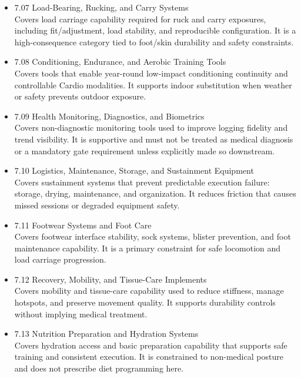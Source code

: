 \documentclass[10pt]{article}
\begin{document}
\begin{itemize}
\item 7.07 Load-Bearing, Rucking, and Carry Systems\\
Covers load carriage capability required for ruck and carry exposures, including fit/adjustment, load stability, and reproducible configuration. It is a high-consequence category tied to foot/skin durability and safety constraints.

\item 7.08 Conditioning, Endurance, and Aerobic Training Tools\\
Covers tools that enable year-round low-impact conditioning continuity and controllable Cardio modalities. It supports indoor substitution when weather or safety prevents outdoor exposure.

\item 7.09 Health Monitoring, Diagnostics, and Biometrics\\
Covers non-diagnostic monitoring tools used to improve logging fidelity and trend visibility. It is supportive and must not be treated as medical diagnosis or a mandatory gate requirement unless explicitly made so downstream.

\item 7.10 Logistics, Maintenance, Storage, and Sustainment Equipment\\
Covers sustainment systems that prevent predictable execution failure: storage, drying, maintenance, and organization. It reduces friction that causes missed sessions or degraded equipment safety.

\item 7.11 Footwear Systems and Foot Care\\
Covers footwear interface stability, sock systems, blister prevention, and foot maintenance capability. It is a primary constraint for safe locomotion and load carriage progression.

\item 7.12 Recovery, Mobility, and Tissue-Care Implements\\
Covers mobility and tissue-care capability used to reduce stiffness, manage hotspots, and preserve movement quality. It supports durability controls without implying medical treatment.

\item 7.13 Nutrition Preparation and Hydration Systems\\
Covers hydration access and basic preparation capability that supports safe training and consistent execution. It is constrained to non-medical posture and does not prescribe diet programming here.


\end{itemize}
\end{document}
